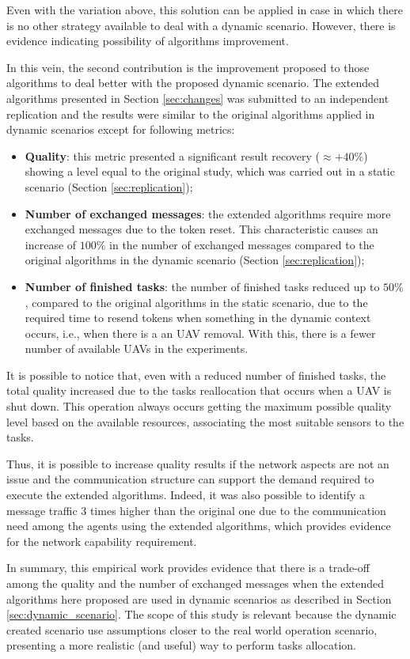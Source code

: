 Even with the variation above, this solution can be applied in case in which there is no other strategy available to deal with a dynamic scenario. However, there is evidence indicating possibility of algorithms improvement.

In this vein, the second contribution is the improvement proposed to those algorithms to deal better with the proposed dynamic scenario. The extended algorithms presented in Section \ref{sec:changes} was submitted to an independent replication and the results were similar to the original algorithms applied in dynamic scenarios except for following metrics:

\begin{itemize}
   \item \textbf{Quality}: this metric presented a significant result recovery ($\approx +40\%$) showing a level equal to the original study, which was carried out in a static scenario (Section \ref{sec:replication});
   \item \textbf{Number of exchanged messages}: the extended algorithms require more exchanged messages due to the token reset. This characteristic causes an increase of $100\%$ in the number of exchanged messages compared to the original algorithms in the dynamic scenario (Section \ref{sec:replication});
   \item \textbf{Number of finished tasks}: the number of finished tasks reduced up to $50\%$, compared to the original algorithms in the static scenario, due to the required time to resend tokens when something in the dynamic context occurs, i.e., when there is a an UAV removal. With this, there is a fewer number of available UAVs in the experiments.
\end{itemize}

It is possible to notice that, even with a reduced number of finished tasks, the total quality increased due to the tasks reallocation that occurs when a UAV is shut down. This operation always occurs getting the maximum possible quality level based on the available resources, associating the most suitable sensors to the tasks.

Thus, it is possible to increase quality results if the network aspects are not an issue and the communication structure can support the demand required to execute the extended algorithms. Indeed, it was also possible to identify a message traffic 3 times higher than the original one due to the communication need among the agents using the extended algorithms, which provides evidence for the network capability requirement.

In summary, this empirical work provides evidence that there is a trade-off among the quality and the number of exchanged messages when the extended algorithms here proposed are used in dynamic scenarios as described in Section \ref{sec:dynamic_scenario}. The scope of this study is relevant because the dynamic created scenario use assumptions closer to the real world operation scenario, presenting a more realistic (and useful) way to perform tasks allocation.